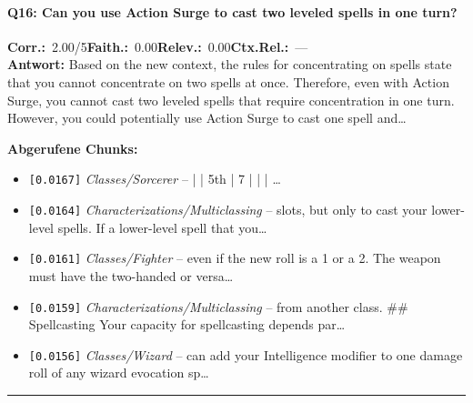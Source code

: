 \paragraph{Q16: Can you use Action Surge to cast two leveled spells in one turn?}
\noindent \textbf{Corr.:}~2.00/5\quad \textbf{Faith.:}~0.00\quad \textbf{Relev.:}~0.00\quad \textbf{Ctx.Rel.:}~—\\

\noindent\textbf{Antwort:} Based on the new context, the rules for concentrating on spells state that you cannot concentrate on two spells at once. Therefore, even with Action Surge, you cannot cast two leveled spells that require concentration in one turn. However, you could potentially use Action Surge to cast one spell and\ldots

\noindent\textbf{Abgerufene Chunks:}
\begin{itemize}[noitemsep, topsep=2pt]
  \item[\textbf{\#1}] \texttt{[0.0167]} \textit{Classes/Sorcerer} -- | | 5th              | 7                  | |                  |                \ldots
  \item[\textbf{\#2}] \texttt{[0.0164]} \textit{Characterizations/Multiclassing} -- slots, but only to cast your lower-level spells. If a lower-level spell that you\ldots
  \item[\textbf{\#3}] \texttt{[0.0161]} \textit{Classes/Fighter} -- even if the new roll is a 1 or a 2. The weapon must have the two-handed or versa\ldots
  \item[\textbf{\#4}] \texttt{[0.0159]} \textit{Characterizations/Multiclassing} -- from another class.  \#\# Spellcasting  Your capacity for spellcasting depends par\ldots
  \item[\textbf{\#5}] \texttt{[0.0156]} \textit{Classes/Wizard} -- can add your Intelligence modifier to one damage roll of any wizard evocation sp\ldots
\end{itemize}
\vspace{4pt}
\hrule
\vspace{6pt}
